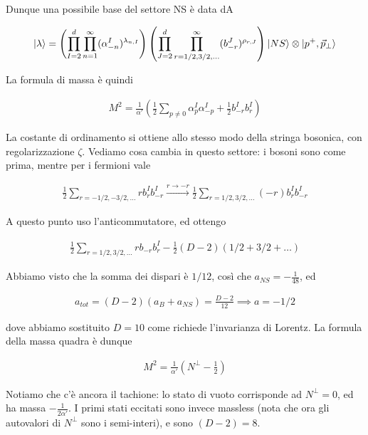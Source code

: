 \documentclass{report}
\begin{document}
Dunque una possibile base del settore NS è data dA

\begin{align}
    \ket{\lambda} = \left(\prod_{I=2}^d\prod_{n=1}^\infty (\alpha_{-n}^I)^{\lambda_{n, I}}\right)\left(\prod_{J=2}^d\prod_{r=1/2, 3/2, \ldots}^\infty (b_{-r}^J)^{\rho_{r, J}}\right) \ket{NS} \otimes \ket{p^+, \vec{p}_\perp}
\end{align}

La formula di massa è quindi 

\begin{align}
    M^2 = \frac{1}{\alpha'}\left( \frac{1}{2}\sum_{p\neq0}\alpha_p^I \alpha_{-p}^I +\frac{1}{2}b^I_{-r}b^I_r\right)
\end{align}

La costante di ordinamento si ottiene allo stesso modo della stringa bosonica, con regolarizzazione \(\zeta\). Vediamo cosa cambia in questo settore: i bosoni sono come prima, mentre per i fermioni vale 

\begin{align}
    \frac{1}{2}\sum_{r = -1/2, -3/2, \ldots} r b_r^I b_{-r}^I \xrightarrow{r \to -r} \frac{1}{2}\sum_{r = 1/2, 3/2, \ldots}(-r)b_r^I b_{-r}^I 
\end{align}

A questo punto uso l'anticommutatore, ed ottengo 

\begin{align}
    \frac{1}{2}\sum_{r = 1/2, 3/2, \ldots}r b_{-r}b_r^I - \frac{1}{2}(D-2)(1/2+3/2+\ldots)
\end{align}

Abbiamo visto che la somma dei dispari è \(1/12\), così che \(a_{NS} = -\frac{1}{48}\), ed 

\begin{align}
    a_{tot} = (D-2)(a_B + a_{NS}) = \frac{D-2}{12} \implies a = -1/2
\end{align}

dove abbiamo sostituito \(D=10\) come richiede l'invarianza di Lorentz. La formula della massa quadra è dunque 

\begin{align}
    M^2 = \frac{1}{\alpha'}\left(N^\perp - \frac{1}{2}\right)
\end{align}

Notiamo che c'è ancora il tachione: lo stato di vuoto corrisponde ad \(N^\perp = 0\), ed ha massa \(-\frac{1}{2\alpha'}\). I primi stati eccitati sono invece massless (nota che ora gli autovalori di \(N^\perp\) sono i semi-interi), e sono \((D-2) = 8\). 
\end{document}
